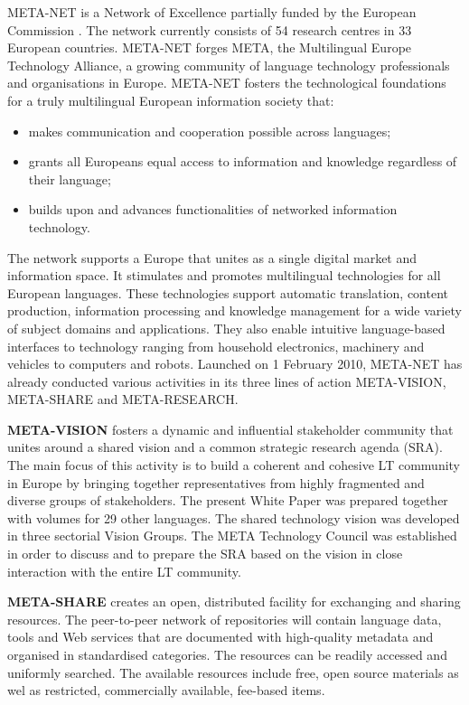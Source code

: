 {\begin{multicols}{2}
META-NET is a Network of Excellence partially funded by the European Commission \cite{rehm2011}. The network currently consists of 54 research centres in 33 European countries. META-NET forges META, the Multilingual Europe Technology Alliance, a growing community of language technology professionals and organisations in Europe. META-NET fosters the technological foundations for a truly multilingual European information society that:

\begin{itemize}
\item makes communication and cooperation possible across languages;
\item grants all Europeans equal access to information and knowledge regardless of their language;
\item builds upon and advances functionalities of networked information technology.
\end{itemize}

The network supports a Europe that unites as a single digital market and information space. It stimulates and promotes multilingual technologies for all European languages. These technologies support automatic translation, content production, information processing and knowledge management for a wide variety of subject domains and applications. They also enable intuitive language-based interfaces to technology ranging from household electronics, machinery and vehicles to computers and robots.
Launched on 1 February 2010, META-NET has already conducted various activities in its three lines of action META-VISION, META-SHARE and META-RESEARCH.

\textbf{META-VISION} fosters a dynamic and influential stakeholder community that unites around a shared vision and a common strategic research agenda (SRA). The main focus of this activity is to build a coherent and cohesive LT community in Europe by bringing together representatives from highly fragmented and diverse groups of stakeholders. The present White Paper was prepared together with volumes for 29 other languages. The shared technology vision was developed in three sectorial Vision Groups. The META Technology Council was established in order to discuss and to prepare the SRA based on the vision in close interaction with the entire LT community.

\textbf{META-SHARE} creates an open, distributed facility for exchanging and sharing resources. The peer-to-peer network of repositories will contain language data, tools and Web services that are documented with high-quality metadata and organised in standardised categories. The resources can be readily accessed and uniformly searched. The available resources include free, open source materials as wel as restricted, commercially available, fee-based items.


\end{multicols}}
